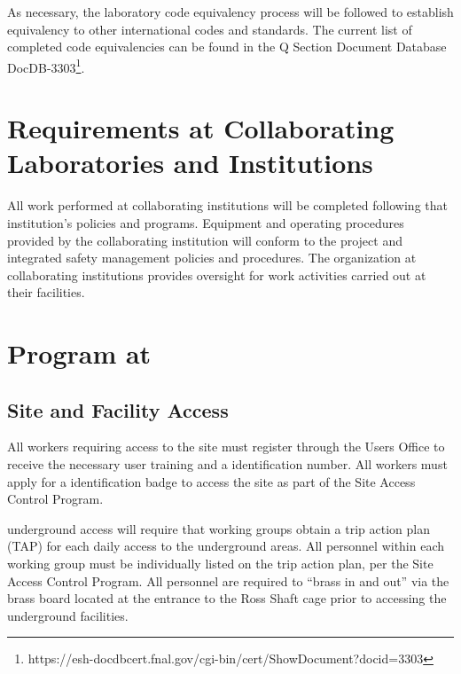 As necessary, the laboratory code equivalency process will be followed
to establish equivalency to other international codes and
standards. The current list of completed code equivalencies can be
found in the Q Section Document Database DocDB-3303\footnote{https://esh-docdbcert.fnal.gov/cgi-bin/cert/ShowDocument?docid=3303}.


\section{ Requirements at Collaborating Laboratories and Institutions}

All work performed at collaborating institutions will be completed
following that institution's  policies and
programs. Equipment and operating procedures provided by the
collaborating institution will conform to the  project
 and integrated safety management policies and
procedures. The  organization at collaborating institutions
provides  oversight for work activities carried
out at their facilities.

\section{  Program at }

\subsection{Site and Facility Access}

All  workers requiring access to the  site must
register through the \fnal Users Office to receive the necessary user
training and a \fnal identification number. All workers must apply for
a  identification badge to access the  site as part of
the  Site Access Control Program.

 underground access will require that working groups
obtain a trip action plan (TAP) for each daily access to the
underground areas.  All personnel within each working group must be
individually listed on the trip action plan, per the  Site
Access Control Program. All personnel are required to ``brass in and
out'' via the brass board located at the entrance to the Ross Shaft
cage prior to accessing the underground facilities.

